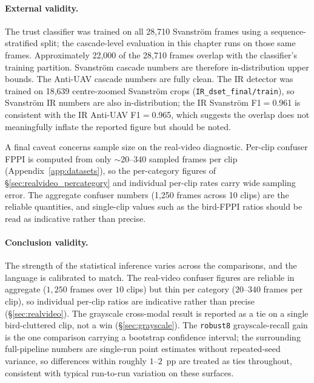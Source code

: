 \documentclass[12pt,a4paper,oneside,openright]{book}
\begin{document}
\paragraph{External validity.}
The trust classifier was trained on all 28,710 Svanstr\"om frames using a sequence-stratified split; the cascade-level evaluation in this chapter runs on those same frames. Approximately 22,000 of the 28,710 frames overlap with the classifier's training partition. Svanstr\"om cascade numbers are therefore in-distribution upper bounds. The Anti-UAV cascade numbers are fully clean. The IR detector was trained on 18,639 centre-zoomed Svanstr\"om crops (\texttt{IR\_dset\_final/train}), so Svanstr\"om IR numbers are also in-distribution; the IR Svanstr\"om F1$=$0.961 is consistent with the IR Anti-UAV F1$=$0.965, which suggests the overlap does not meaningfully inflate the reported figure but should be noted.

A final caveat concerns sample size on the real-video diagnostic. Per-clip confuser FPPI is computed from only $\sim$20--340 sampled frames per clip (Appendix~\ref{app:datasets}), so the per-category figures of \S\ref{sec:realvideo_percategory} and individual per-clip rates carry wide sampling error. The aggregate confuser numbers (1{,}250 frames across 10 clips) are the reliable quantities, and single-clip values such as the bird-FPPI ratios should be read as indicative rather than precise.

\paragraph{Conclusion validity.}
The strength of the statistical inference varies across the comparisons, and the language is calibrated to match. The real-video confuser figures are reliable in aggregate ($1{,}250$ frames over $10$ clips) but thin per category ($20$--$340$ frames per clip), so individual per-clip ratios are indicative rather than precise (\S\ref{sec:realvideo}). The grayscale cross-modal result is reported as a tie on a single bird-cluttered clip, not a win (\S\ref{sec:grayscale}). The \texttt{robust8} grayscale-recall gain is the one comparison carrying a bootstrap confidence interval; the surrounding full-pipeline numbers are single-run point estimates without repeated-seed variance, so differences within roughly $1$--$2$~pp are treated as ties throughout, consistent with typical run-to-run variation on these surfaces.
\end{document}
